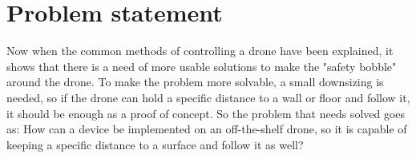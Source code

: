 \section{Problem statement}\label{s:problem_statment}
Now when the common methods of controlling a drone have been explained, it shows that there is a need of more usable solutions to make the "safety bobble" around the drone. To make the problem more solvable, a small downsizing is needed, so if the drone can hold a specific distance to a wall or floor and follow it, it should be enough as a proof of concept.
\newline
So the problem that needs solved goes as:
How can a device be implemented on an off-the-shelf drone, so it is capable of keeping a specific distance to a surface and follow it as well?

